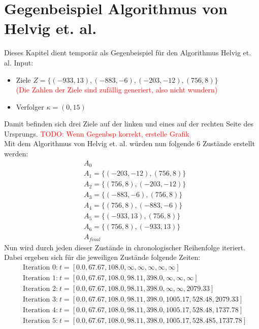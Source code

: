\documentclass[german,version-2019-11]{uzl-thesis}
\begin{document}
\chapter{Gegenbeispiel Algorithmus von Helvig et. al.}

Dieses Kapitel dient temporär als Gegenbeispiel für den Algorithmus Helvig et. al. 
Input: 
\begin{itemize}
\item
Ziele $Z=\{(-933,13),(-883,-6),(-203,-12),(756,8)\}$\\
\textcolor{red}{(Die Zahlen der Ziele sind zufällig generiert, also nicht wundern)}
\item
Verfolger $\kappa=(0,15)$
\end{itemize}
Damit befinden sich drei Ziele auf der linken und eines auf der rechten Seite des Ursprungs.
\textcolor{red}{TODO: Wenn Gegenbsp korrekt, erstelle Grafik}\\
Mit dem Algorithmus von Helvig et. al. würden nun folgende 6 Zustände erstellt werden:
\begin{align*}
&A_0 \\
&A_1 = \{(-203, -12), (756, 8)\}\\
&A_2 = \{(756, 8), (-203, -12)\}\\
&A_3 = \{(-883, -6), (756, 8)\}\\
&A_4 = \{(756, 8), (-883, -6)\}\\
&A_5 = \{(-933, 13), (756, 8)\}\\
&A_6 = \{(756, 8), (-933, 13)\}\\
&A_{final} 
\end{align*}
Nun wird durch jeden dieser Zustände in chronologischer Reihenfolge iteriert. Dabei ergeben sich für die jeweiligen Zustände folgende Zeiten:
\begin{align*}
&\text{Iteration 0:}~t=[0.0, 67.67, 108.0, \infty, \infty, \infty, \infty, \infty] \\
&\text{Iteration 1:}~t=[0.0, 67.67, 108.0, 98.11, 398.0, \infty, \infty, \infty] \\
&\text{Iteration 2:}~t=[0.0, 67.67, 108.0, 98.11, 398.0, \infty, \infty, 2079.33] \\
&\text{Iteration 3:}~t=[0.0, 67.67, 108.0, 98.11, 398.0, 1005.17, 528.48, 2079.33] \\
&\text{Iteration 4:}~t=[0.0, 67.67, 108.0, 98.11, 398.0, 1005.17, 528.48, 1737.78] \\
&\text{Iteration 5:}~t=[0.0, 67.67, 108.0, 98.11, 398.0, 1005.17, 528.485, 1737.78]
\end{align*}
\end{document}
